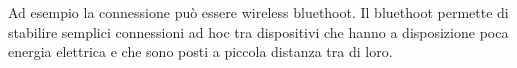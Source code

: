 \begin{description}
% 
% 
% 
% 
Ad esempio la connessione pu\`o essere wireless bluethoot.
Il bluethoot permette di stabilire semplici connessioni ad hoc tra dispositivi che hanno a disposizione poca energia elettrica e che sono posti a piccola distanza tra di loro.
% 
% 
% 


\end{description}
